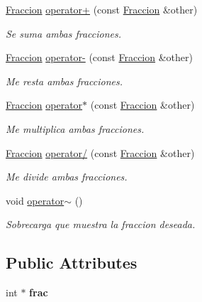 \begin{DoxyCompactItemize}
\item 
\hyperlink{class_fraccion}{Fraccion} \hyperlink{class_fraccion_ad04d7b21a8d4067c9f3a6915de77cc59}{operator+} (const \hyperlink{class_fraccion}{Fraccion} \&other)
\begin{DoxyCompactList}\small\item\em Se suma ambas fracciones. \end{DoxyCompactList}\item 
\hyperlink{class_fraccion}{Fraccion} \hyperlink{class_fraccion_afcb21311a6236605f60964da28482a84}{operator-\/} (const \hyperlink{class_fraccion}{Fraccion} \&other)
\begin{DoxyCompactList}\small\item\em Me resta ambas fracciones. \end{DoxyCompactList}\item 
\hyperlink{class_fraccion}{Fraccion} \hyperlink{class_fraccion_aba7e8118b2dd42f449a865b422c71760}{operator$\ast$} (const \hyperlink{class_fraccion}{Fraccion} \&other)
\begin{DoxyCompactList}\small\item\em Me multiplica ambas fracciones. \end{DoxyCompactList}\item 
\hyperlink{class_fraccion}{Fraccion} \hyperlink{class_fraccion_a2fb92d2778ccefa7a0e751568ff7cd86}{operator/} (const \hyperlink{class_fraccion}{Fraccion} \&other)
\begin{DoxyCompactList}\small\item\em Me divide ambas fracciones. \end{DoxyCompactList}\item 
void \hyperlink{class_fraccion_a6ba2dac78e5ef60d6860d39ba3489bb1}{operator$\sim$} ()\hypertarget{class_fraccion_a6ba2dac78e5ef60d6860d39ba3489bb1}{}\label{class_fraccion_a6ba2dac78e5ef60d6860d39ba3489bb1}

\begin{DoxyCompactList}\small\item\em Sobrecarga que muestra la fraccion deseada. \end{DoxyCompactList}\end{DoxyCompactItemize}
\subsection*{Public Attributes}
\begin{DoxyCompactItemize}
\item 
int $\ast$ {\bfseries frac}\hypertarget{class_fraccion_a3bfdac828fde46e72c0e640e982ffedd}{}\label{class_fraccion_a3bfdac828fde46e72c0e640e982ffedd}

\end{DoxyCompactItemize}


